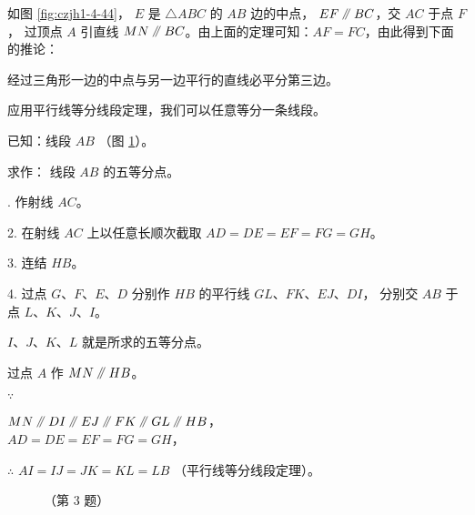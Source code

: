 如图 \ref{fig:czjh1-4-44}， $E$ 是 $\triangle ABC$ 的 $AB$ 边的中点， $EF \pingxing BC$，交 $AC$ 于点 $F$，
过顶点 $A$ 引直线 $MN \pingxing BC$。由上面的定理可知：$AF = FC$，由此得到下面的推论：

\begin{tuilun}[推论2]
    经过三角形一边的中点与另一边平行的直线必平分第三边。
\end{tuilun}

应用平行线等分线段定理，我们可以任意等分一条线段。

\liti[0] 已知：线段 $AB$ （图 \ref{fig:czjh1-4-45}）。

求作： 线段 $AB$ 的五等分点。

. 作射线 $AC$。

2. 在射线 $AC$ 上以任意长顺次截取 $AD = DE = EF = FG = GH$。

3. 连结 $HB$。

4. 过点 $G$、$F$、$E$、$D$ 分别作 $HB$ 的平行线 $GL$、$FK$、$EJ$、$DI$，
分别交 $AB$ 于点 $L$、$K$、$J$、$I$。

$I$、$J$、$K$、$L$ 就是所求的五等分点。

\zhengming  过点 $A$ 作 $MN \pingxing HB$。

$\because$ \quad \begin{zmtblr}[t]{}
    $MN \pingxing DI \pingxing EJ \pingxing FK \pingxing GL \pingxing HB$， \\
    $AD = DE = EF = FG = GH$，
\end{zmtblr}

$\therefore$ \quad $AI = IJ = JK = KL = LB$ （平行线等分线段定理）。

\begin{figure}[htbp]
    \centering
    \begin{minipage}[b]{7cm}
        \centering
        
        \caption{}\label{fig:czjh1-4-45}
    \end{minipage}
    \qquad
    \begin{minipage}[b]{7cm}
        \centering
        
        \caption*{（第 3 题）}
    \end{minipage}
\end{figure}

\begin{lianxi}




\end{lianxi}


